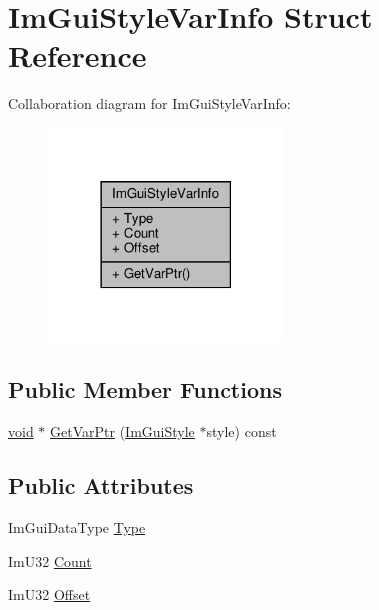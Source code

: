 \hypertarget{structImGuiStyleVarInfo}{}\section{Im\+Gui\+Style\+Var\+Info Struct Reference}
\label{structImGuiStyleVarInfo}


Collaboration diagram for Im\+Gui\+Style\+Var\+Info\+:
\nopagebreak
\begin{figure}[H]
\begin{center}
\leavevmode
\includegraphics[width=177pt]{structImGuiStyleVarInfo__coll__graph}
\end{center}
\end{figure}
\subsection*{Public Member Functions}
\begin{DoxyCompactItemize}
\item 
\hyperlink{imgui__impl__opengl3__loader_8h_ac668e7cffd9e2e9cfee428b9b2f34fa7}{void} $\ast$ \hyperlink{structImGuiStyleVarInfo_a92aebc5f0d8b2b43b61dbcaf992b5643}{Get\+Var\+Ptr} (\hyperlink{structImGuiStyle}{Im\+Gui\+Style} $\ast$style) const
\end{DoxyCompactItemize}
\subsection*{Public Attributes}
\begin{DoxyCompactItemize}
\item 
Im\+Gui\+Data\+Type \hyperlink{structImGuiStyleVarInfo_a62f42d2bb7b71b7530493e16e622cb81}{Type}
\item 
Im\+U32 \hyperlink{structImGuiStyleVarInfo_acfab57d23ba575db3595da80989b444e}{Count}
\item 
Im\+U32 \hyperlink{structImGuiStyleVarInfo_ae900d6a02166d3d0433c18b95aec10e8}{Offset}
\end{DoxyCompactItemize}


